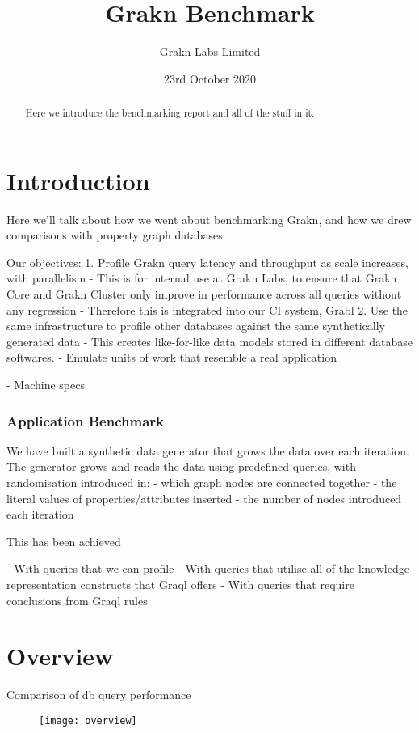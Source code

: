 \documentclass{article}
\begin{document}
\title{Grakn Benchmark}
\date{23rd October 2020}
\author{Grakn Labs Limited}

\maketitle

\begin{abstract}
Here we introduce the benchmarking report and all of the stuff in it.
\end{abstract}

\section{Introduction}
Here we'll talk about how we went about benchmarking Grakn, and how we drew comparisons with property graph databases.

Our objectives:
1. Profile Grakn query latency and throughput as scale increases, with parallelism
    - This is for internal use at Grakn Labs, to ensure that Grakn Core and Grakn Cluster only improve in performance across all queries without any regression
    - Therefore this is integrated into our CI system, Grabl
2. Use the same infrastructure to profile other databases against the same synthetically generated data
    - This creates like-for-like data models stored in different database softwares.
    - Emulate units of work that resemble a real application

- Machine specs

\subsubsection{Application Benchmark}

We have built a synthetic data generator that grows the data over each iteration. The generator grows and reads the data using predefined queries, with randomisation introduced in:
- which graph nodes are connected together
- the literal values of properties/attributes inserted
- the number of nodes introduced each iteration

This has been achieved

- With queries that we can profile
- With queries that utilise all of the knowledge representation constructs that Graql offers
- With queries that require conclusions from Graql rules


\section{Overview}
Comparison of db query performance

\begin{figure}[H]
\centering
\texttt{[image: overview]}
\end{figure}
\end{document}
